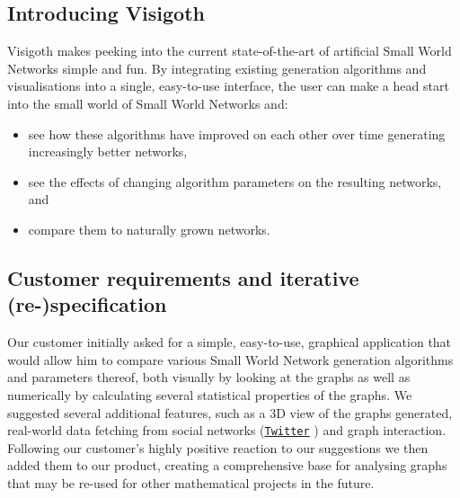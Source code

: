 \documentclass[a4paper,11pt,titlepage]{article}
\let\stdhref\href
\renewcommand{\href}[2]{\stdhref{#1}{\texttt{#2}}}
\let\stdsection\section         %
\renewcommand{\section}{\newpage\stdsection}
\newcommand{\Twitter}{\href{http://twitter.com}{Twitter} }
\begin{document}

\subsection{Introducing Visigoth}

Visigoth makes peeking into the current state-of-the-art of artificial Small
World Networks simple and fun. By integrating existing generation algorithms and
visualisations into a single, easy-to-use interface, the user can make a head
start into the small world of Small World Networks and:

\begin{itemize}
  \item see how these algorithms have improved on each other over time
    generating increasingly better networks,
  \item see the effects of changing algorithm parameters on the
    resulting networks, and
  \item compare them to naturally grown networks.
\end{itemize}

\subsection{Customer requirements and iterative (re-)specification}

%
%

Our customer initially asked for a simple, easy-to-use, graphical
application that would allow him to compare various Small World
Network generation algorithms and parameters thereof, both visually
by looking at the graphs as well as numerically by calculating
several statistical properties of the graphs.
We suggested several additional features, such as a 3D view of the
graphs generated, real-world data fetching from social networks
(\Twitter) and graph interaction. Following our customer's highly
positive reaction to our suggestions we then added them to our
product, creating a comprehensive base for analysing graphs that
may be re-used for other mathematical projects in the future.


\end{document}
